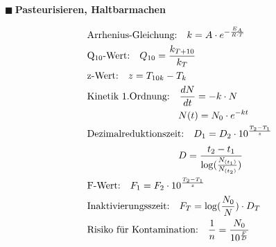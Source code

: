 \documentclass[a4paper,10pt]{article}
\renewcommand{\textbf}[1]{\textsf{{\bfseries {#1}}}}
\renewcommand{\plmtsquare}{{\color{miugray} $\blacksquare~$}}
\begin{document}
\begin{minipage}[t]{.45\textwidth}
\vspace*{8mm}
\plmtsquare \textbf{Pasteurisieren, Haltbarmachen} \par \vspace*{-4mm}
\begin{align*}
&\text{Arrhenius-Gleichung:} \quad k = A \cdot e^{-\frac{E_A}{R \cdot T}} \\
&\text{Q$_{10}$-Wert:} \quad Q_{10} = \frac{k_{T+10}}{k_T} \\
&\text{z-Wert:} \quad z = T_{10k} - T_k \\
&\text{Kinetik 1.Ordnung:} \quad \frac{dN}{dt} = -k \cdot N \\
& \hspace*{3.3cm} N(t) = N_0 \cdot e^{-kt} \\
&\text{Dezimalreduktionszeit:} \quad D_1 = D_2 \cdot 10^{\frac{T_2 - T_1}{z}} \\[2pt]
&\hspace*{3.3cm} D = \frac{t_2-t_1}{\log(\frac{N_{(t_1)}}{N_{(t_2)}})} \\
&\text{F-Wert:} \quad F_1 = F_2 \cdot 10^{\frac{T_2 - T_1}{z}} \\
&\text{Inaktivierungsszeit:} \quad F_T = \log(\frac{N_0}{N}) \cdot D_T \\
&\text{Risiko für Kontamination:} \quad \frac{1}{n} = \frac{N_0}{10^{\frac{F}{D}}} 
\end{align*}



\end{minipage}\hfill
\end{document}
